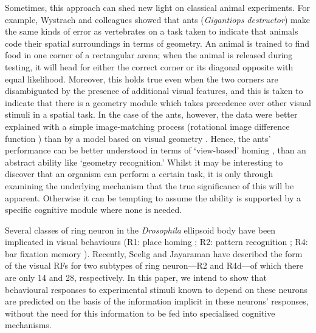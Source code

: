 Sometimes, this approach can shed new light on classical animal experiments.
For example, Wystrach and colleagues \cite{Wystrach2011} showed that ants (\emph{Gigantiops destructor}) make the same kinds of error as vertebrates on a task taken to indicate that animals code their spatial surroundings in terms of geometry.
An animal is trained to find food in one corner of a rectangular arena; when the animal is released during testing, it will head for either the correct corner or its diagonal opposite with equal likelihood.
Moreover, this holds true even when the two corners are disambiguated by the presence of additional visual features, and this is taken to indicate that there is a geometry module which takes precedence over other visual stimuli in a spatial task.
In the case of the ants, however, the data were better explained with a simple image-matching process (rotational image difference function \cite{Philippides2011,Zeil2003}) than by a model based on visual geometry \cite{Wystrach2011}.
Hence, the ants' performance can be better understood in terms of `view-based' homing \cite{Wystrach2013,Philippides2011,Baddeley2011,Lent2010}, than an abstract ability like `geometry recognition.'
Whilst it may be interesting to discover that an organism can perform a certain task, it is only through examining the underlying mechanism that the true significance of this will be apparent.
Otherwise it can be tempting to assume the ability is supported by a specific cognitive module \cite{Fodor1983} where none is needed.

Several classes of ring neuron in the \emph{Drosophila} ellipsoid body have been implicated in visual behaviours (R1: place homing \cite{Ofstad2011,Sitaraman2010,Sitaraman2008}; R2: pattern recognition \cite{Pan2009,Liu2006,Ernst1999}; R4: bar fixation memory \cite{Neuser2008}).
Recently, Seelig and Jayaraman \cite{Seelig2013} have described the form of the visual \acp{RF} for two subtypes of ring neuron---R2 and R4d---of which there are only 14 and 28, respectively.
In this paper, we intend to show that behavioural responses to experimental stimuli known to depend on these neurons are predicted on the basis of the information implicit in these neurons' responses, without the need for this information to be fed into specialised cognitive mechanisms.

